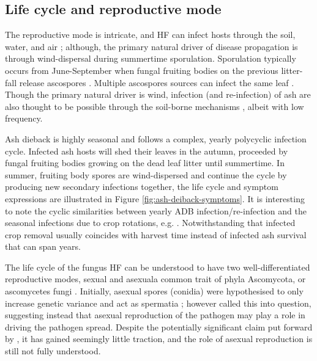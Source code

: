 \subsection{Life cycle and reproductive mode}

The reproductive mode is intricate, and HF can infect hosts through the soil,
water, and air \cite{gross2012reproductive}; 
although, the primary natural driver of disease propagation is through wind-dispersal
during summertime sporulation. Sporulation typically occurs from June-September when 
fungal fruiting bodies on the previous litter-fall release ascospores \cite{grosdidier2018tracking, hietala2013invasive}.
Multiple ascospores sources can infect the same leaf \cite{gross2012reproductive}. 
Though the primary natural driver is wind, infection (and re-infection) of ash are also thought to be possible 
through the soil-borne mechanisms \cite{fones2016role}, albeit with low frequency.

Ash dieback is highly seasonal \cite{bengtsson2014seasonal} and follows a complex, yearly polycyclic infection cycle.
Infected ash hosts will shed their leaves in the autumn, proceeded by fungal fruiting bodies growing on the dead leaf litter until summertime.
In summer, fruiting body spores are wind-dispersed and continue the cycle by producing new secondary infections\textemdash 
together, the life cycle and symptom expressions are illustrated in Figure \ref{fig:ash-deiback-symptoms}.
It is interesting to note the cyclic similarities between yearly ADB infection/re-infection and the seasonal
infections due to crop rotations, e.g. \cite{tankam2020modelling}. 
Notwithstanding that infected crop removal usually coincides with harvest time instead of infected ash survival that can span years.

The life cycle of the fungus HF can be understood to have two well-differentiated reproductive modes, 
sexual and asexual\textemdash a common trait of phyla Ascomycota, or ascomycetes fungi \cite{hawker2016physiology}.
Initially, asexual spores (conidia) were hypothesised to only increase genetic variance and act as spermatia \cite{gross2014h};
however \cite{fones2016role} called this into question, suggesting instead that asexual reproduction of the pathogen 
may play a role in driving the pathogen spread. Despite the potentially significant claim put forward by \cite{fones2016role},
it has gained seemingly little traction, and the role of asexual reproduction is still not fully understood.

